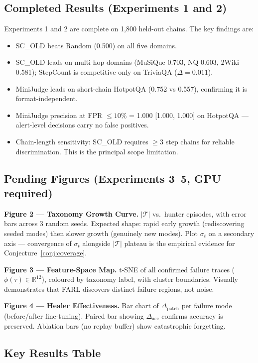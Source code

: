 \documentclass[11pt,a4paper]{article}
\begin{document}
\subsection{Completed Results (Experiments 1 and 2)}

Experiments 1 and 2 are complete on 1,800 held-out chains.
The key findings are:
\begin{itemize}
  \item SC\_OLD beats Random (0.500) on all five domains.
  \item SC\_OLD leads on multi-hop domains (MuSiQue 0.703, NQ 0.603, 2Wiki 0.581);
        StepCount is competitive only on TriviaQA ($\Delta = 0.011$).
  \item MiniJudge leads on short-chain HotpotQA (0.752 vs 0.557),
        confirming it is format-independent.
  \item MiniJudge precision at FPR $\leq 10\%$ = 1.000 [1.000, 1.000]
        on HotpotQA --- alert-level decisions carry no false positives.
  \item Chain-length sensitivity: SC\_OLD requires $\geq 3$ step chains
        for reliable discrimination. This is the principal scope limitation.
\end{itemize}

\subsection{Pending Figures (Experiments 3--5, GPU required)}

\textbf{Figure 2 --- Taxonomy Growth Curve.}
$|\mathcal{T}|$ vs.\ hunter episodes, with error bars across 3 random seeds.
Expected shape: rapid early growth (rediscovering seeded modes) then slower
growth (genuinely new modes). Plot $\sigma_t$ on a secondary axis ---
convergence of $\sigma_t$ alongside $|\mathcal{T}|$ plateau is the empirical
evidence for Conjecture~\ref{conj:coverage}.

\textbf{Figure 3 --- Feature-Space Map.}
t-SNE of all confirmed failure traces ($\phi(\tau) \in \mathbb{R}^{12}$),
coloured by taxonomy label, with cluster boundaries. Visually demonstrates
that FARL discovers distinct failure regions, not noise.

\textbf{Figure 4 --- Healer Effectiveness.}
Bar chart of $\Delta_\text{patch}$ per failure mode (before/after fine-tuning).
Paired bar showing $\Delta_\text{acc}$ confirms accuracy is preserved.
Ablation bars (no replay buffer) show catastrophic forgetting.

\subsection{Key Results Table}
\end{document}
